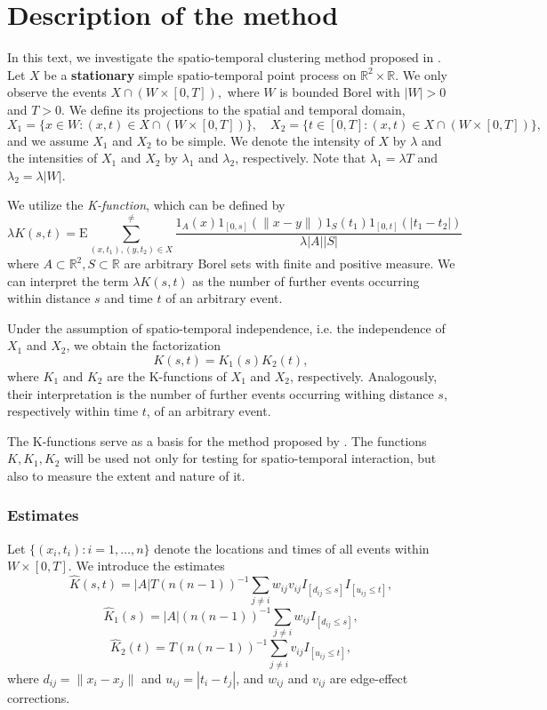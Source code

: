 \documentclass{article}
\begin{document}
\section{Description of the method}
In this text, we investigate the spatio-temporal clustering method proposed in \cite{diggle1995}. Let $X$ be a \textbf{stationary} simple spatio-temporal point process on $\mathbb R^2\times \mathbb R$. We only observe the events $X\cap(W\times [0,T]),$ where $W$ is bounded Borel with $|W|>0$ and $T>0$. We define its projections to the spatial and temporal domain,
$$X_1 = \{x \in W: (x,t)\in X\cap (W\times [0,T])\}, \quad X_2 = \{t \in [0,T]: (x,t) \in X\cap (W\times [0,T])\},$$
and we assume $X_1$ and $X_2$ to be simple. We denote the intensity of $X$ by $\lambda$ and the intensities of $X_1$ and $X_2$ by $\lambda_1$ and $\lambda_2$, respectively. Note that $\lambda_1 = \lambda T$ and $\lambda_2 = \lambda |W|$.


We utilize the \textit{K-function}, which can be defined by
$$\lambda K(s,t) = \mathrm{E} \sum^{\neq}_{(x,t_1),(y,t_2)\in X} \frac{1_A(x) 1_{[0,s]}(\|x-y\|) 1_S(t_1) 1_{[0,t]}(|t_1 - t_2|)}{\lambda |A| |S|}$$
where $A \subset \mathbb R^2, S \subset \mathbb R$ are arbitrary Borel sets with finite and positive measure. We can interpret the term $\lambda K(s,t)$ as the number of further events occurring within distance $s$ and time $t$ of an arbitrary event.

Under the assumption of spatio-temporal independence, i.e. the independence of $X_1$ and $X_2$, we obtain the factorization
$$K(s,t)=K_1(s)K_2(t),$$
where $K_1$ and $K_2$ are the K-functions of $X_1$ and $X_2$, respectively. Analogously, their interpretation is the number of further events occurring withing distance $s$, respectively within time $t$, of an arbitrary event.

The K-functions serve as a basis for the method proposed by \cite{diggle1995}. The functions $K,K_1,K_2$ will be used not only for testing for spatio-temporal interaction, but also to measure the extent and nature of it.

\subsubsection{Estimates}

Let $\{(x_i,t_i): i=1,\dots, n\}$ denote the locations and times of all events within $W\times [0,T]$. We introduce the estimates
$$\hat K(s,t) = |A|T (n(n-1))^{-1} \sum_{j\neq i} w_{ij} v_{ij} I_{[d_{ij} \leq s]} I_{[u_{ij} \leq t]},$$	
$$\hat K_1(s) = |A| (n(n-1))^{-1} \sum_{j\neq i} w_{ij}  I_{[d_{ij} \leq s]},$$	
$$\hat K_2(t) = T (n(n-1))^{-1} \sum_{j\neq i}  v_{ij}  I_{[u_{ij} \leq t]},$$
where $d_{ij} = \|x_i - x_j\|$ and $u_{ij} = |t_i - t_j|$, and $w_{ij}$ and $v_{ij}$ are edge-effect corrections.
\end{document}
